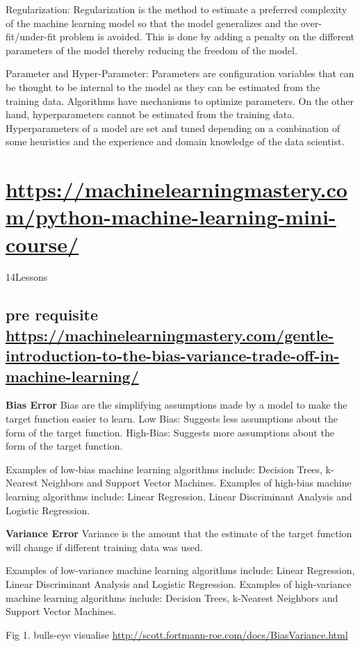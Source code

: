 \documentclass[11pt]{article}
\begin{document}
Regularization: Regularization is the method to estimate a preferred
complexity of the machine learning model so that the model generalizes
and the over-fit/under-fit problem is avoided. This is done by adding
a penalty on the different parameters of the model thereby reducing
the freedom of the model.

Parameter and Hyper-Parameter: Parameters are configuration variables
that can be thought to be internal to the model as they can be
estimated from the training data. Algorithms have mechanisms to
optimize parameters. On the other hand, hyperparameters cannot be
estimated from the training data. Hyperparameters of a model are set
and tuned depending on a combination of some heuristics and the
experience and domain knowledge of the data scientist.


\section{\url{https://machinelearningmastery.com/python-machine-learning-mini-course/}}
\label{sec:org707410d}
14Lessons
\subsection{pre requisite \url{https://machinelearningmastery.com/gentle-introduction-to-the-bias-variance-trade-off-in-machine-learning/}}
\label{sec:org3af63c3}
\textbf{Bias Error}
Bias are the simplifying assumptions made by a model to make the target function easier to learn.
Low Bias: Suggests less assumptions about the form of the target function.
High-Bias: Suggests more assumptions about the form of the target function.

Examples of low-bias machine learning algorithms include: Decision Trees, k-Nearest Neighbors and Support Vector Machines.
Examples of high-bias machine learning algorithms include: Linear Regression, Linear Discriminant Analysis and Logistic Regression.

\textbf{Variance Error}
Variance is the amount that the estimate of the target function will change if different training data was used.

Examples of low-variance machine learning algorithms include: Linear Regression, Linear Discriminant Analysis and Logistic Regression.
Examples of high-variance machine learning algorithms include: Decision Trees, k-Nearest Neighbors and Support Vector Machines.

Fig 1. bulls-eye visualise \url{http://scott.fortmann-roe.com/docs/BiasVariance.html}
\end{document}
